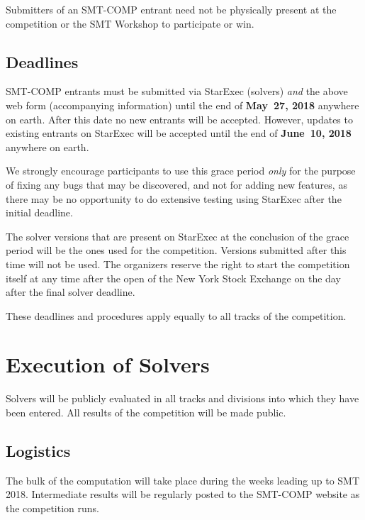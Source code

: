 \documentclass[12pt]{article}
\begin{document}
%
Submitters of an SMT-COMP entrant need not be physically present at
the competition or the SMT Workshop to participate or win.


\subsection*{Deadlines}

SMT-COMP entrants must be submitted via StarExec (solvers) \emph{and}
the above web form (accompanying information) until the end of {\bf
  May~27, 2018} anywhere on earth.
After this date no new entrants will be accepted.
However, updates to existing entrants on StarExec
will be accepted until the end of {\bf June~10, 2018} anywhere on earth.

We strongly encourage participants to use this grace period
\emph{only} for the purpose of fixing any bugs that may be discovered,
and not for adding new features, as there may be no opportunity to do
extensive testing using StarExec after the initial deadline.

The solver versions that are present on StarExec at the conclusion of
the grace period will be the ones used for the competition.  Versions
submitted after this time will not be used.  The organizers reserve
the right to start the competition itself at any time after the open
of the New York Stock Exchange on the day after the final solver
deadline.

These deadlines and procedures apply equally to all tracks of the
competition.


\section{Execution of Solvers}

Solvers will be publicly evaluated in all tracks and divisions into
which they have been entered.  All results of the competition will be
made public.

\subsection{Logistics}
\label{sec:logistics}

%
The bulk of the computation will take place during the weeks leading
up to SMT 2018.  Intermediate results will be regularly posted to the
SMT-COMP website as the competition runs.
\end{document}
